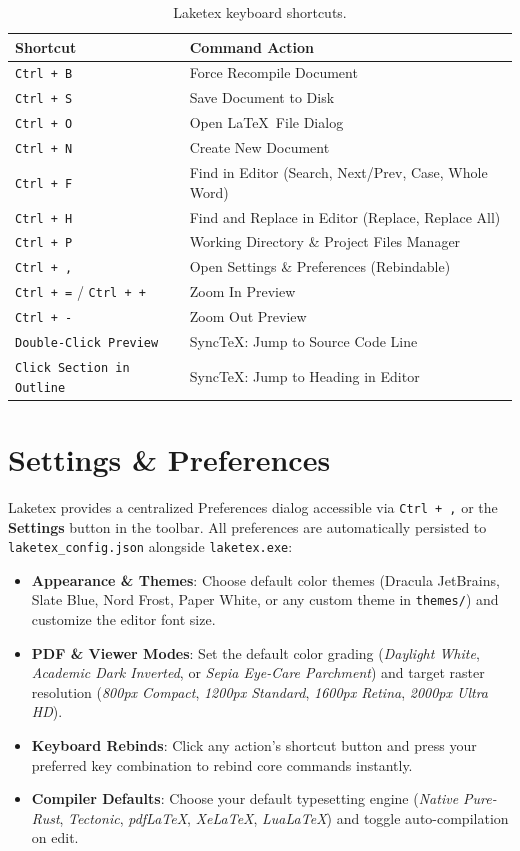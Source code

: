 \documentclass[11pt, a4paper]{article}
\begin{document}
\begin{table}[htbp]
\centering
\begin{tabular}{ll}
\toprule
\textbf{Shortcut} & \textbf{Command Action} \\
\midrule
\texttt{Ctrl + B} & Force Recompile Document \\
\texttt{Ctrl + S} & Save Document to Disk \\
\texttt{Ctrl + O} & Open \LaTeX\ File Dialog \\
\texttt{Ctrl + N} & Create New Document \\
\texttt{Ctrl + F} & Find in Editor (Search, Next/Prev, Case, Whole Word) \\
\texttt{Ctrl + H} & Find and Replace in Editor (Replace, Replace All) \\
\texttt{Ctrl + P} & Working Directory \& Project Files Manager \\
\texttt{Ctrl + ,} & Open Settings \& Preferences (Rebindable) \\
\texttt{Ctrl + =} / \texttt{Ctrl + +} & Zoom In Preview \\
\texttt{Ctrl + -} & Zoom Out Preview \\
\texttt{Double-Click Preview} & SyncTeX: Jump to Source Code Line \\
\texttt{Click Section in Outline} & SyncTeX: Jump to Heading in Editor \\
\bottomrule
\end{tabular}
\caption{Laketex keyboard shortcuts.}
\label{tab:shortcuts}
\end{table}

\section{Settings \& Preferences}

Laketex provides a centralized Preferences dialog accessible via \texttt{Ctrl + ,} or the \textbf{Settings} button in the toolbar. All preferences are automatically persisted to \texttt{laketex\_config.json} alongside \texttt{laketex.exe}:
\begin{itemize}
    \item \textbf{Appearance \& Themes}: Choose default color themes (Dracula JetBrains, Slate Blue, Nord Frost, Paper White, or any custom theme in \texttt{themes/}) and customize the editor font size.
    \item \textbf{PDF \& Viewer Modes}: Set the default color grading (\textit{Daylight White}, \textit{Academic Dark Inverted}, or \textit{Sepia Eye-Care Parchment}) and target raster resolution (\textit{800px Compact}, \textit{1200px Standard}, \textit{1600px Retina}, \textit{2000px Ultra HD}).
    \item \textbf{Keyboard Rebinds}: Click any action's shortcut button and press your preferred key combination to rebind core commands instantly.
    \item \textbf{Compiler Defaults}: Choose your default typesetting engine (\textit{Native Pure-Rust}, \textit{Tectonic}, \textit{pdfLaTeX}, \textit{XeLaTeX}, \textit{LuaLaTeX}) and toggle auto-compilation on edit.
\end{itemize}
\end{document}

